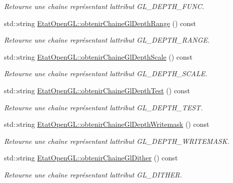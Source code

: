 \begin{DoxyCompactItemize}
\begin{DoxyCompactList}\small\item\em Retourne une chaîne représentant l\textquotesingle{}attribut G\+L\+\_\+\+D\+E\+P\+T\+H\+\_\+\+F\+U\+N\+C. \end{DoxyCompactList}\item 
std\+::string \hyperlink{group__utilitaire_ga9921b541644f4dc3b64a4ffd4a661a09}{Etat\+Open\+G\+L\+::obtenir\+Chaine\+Gl\+Depth\+Range} () const 
\begin{DoxyCompactList}\small\item\em Retourne une chaîne représentant l\textquotesingle{}attribut G\+L\+\_\+\+D\+E\+P\+T\+H\+\_\+\+R\+A\+N\+G\+E. \end{DoxyCompactList}\item 
std\+::string \hyperlink{group__utilitaire_ga4fac162003ef8c012c16ecd9041794ae}{Etat\+Open\+G\+L\+::obtenir\+Chaine\+Gl\+Depth\+Scale} () const 
\begin{DoxyCompactList}\small\item\em Retourne une chaîne représentant l\textquotesingle{}attribut G\+L\+\_\+\+D\+E\+P\+T\+H\+\_\+\+S\+C\+A\+L\+E. \end{DoxyCompactList}\item 
std\+::string \hyperlink{group__utilitaire_ga712bcce1fd6c63377d2b3c9c421f7559}{Etat\+Open\+G\+L\+::obtenir\+Chaine\+Gl\+Depth\+Test} () const 
\begin{DoxyCompactList}\small\item\em Retourne une chaîne représentant l\textquotesingle{}attribut G\+L\+\_\+\+D\+E\+P\+T\+H\+\_\+\+T\+E\+S\+T. \end{DoxyCompactList}\item 
std\+::string \hyperlink{group__utilitaire_gaec88db9c85bfd66909d3172982025862}{Etat\+Open\+G\+L\+::obtenir\+Chaine\+Gl\+Depth\+Writemask} () const 
\begin{DoxyCompactList}\small\item\em Retourne une chaîne représentant l\textquotesingle{}attribut G\+L\+\_\+\+D\+E\+P\+T\+H\+\_\+\+W\+R\+I\+T\+E\+M\+A\+S\+K. \end{DoxyCompactList}\item 
std\+::string \hyperlink{group__utilitaire_gabc6e75dad01908ff21a473d75483f691}{Etat\+Open\+G\+L\+::obtenir\+Chaine\+Gl\+Dither} () const 
\begin{DoxyCompactList}\small\item\em Retourne une chaîne représentant l\textquotesingle{}attribut G\+L\+\_\+\+D\+I\+T\+H\+E\+R. \end{DoxyCompactList}\item 

\end{DoxyCompactItemize}
